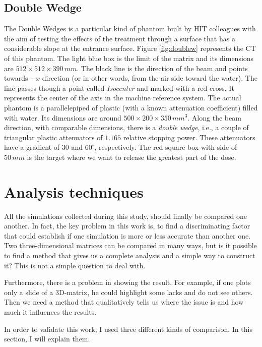 \documentclass[12pt, a4paper, twoside]{book}
\begin{document}
\subsection{Double Wedge} 
The Double Wedges is a particular kind of phantom built by HIT colleagues with the aim of testing the effects of the treatment through a surface that has a considerable slope at the entrance surface. 
Figure \ref{fig:doublew} represents the CT of this phantom. The light blue box is the limit of the matrix and its dimensions are $512\times512\times390\,mm$. The black line is the direction of the beam and points towards $-x$ direction (or in other words, from the air side toward the water). The line passes though a point called \emph{Isocenter} and marked with a red cross. It represents the center of the axis in the machine reference system.
The actual phantom is a parallelepiped of plastic (with a known attenuation coefficient) filled with water. Its dimensions are around $500\times200\times350\,mm^3$. Along the beam direction, with comparable dimensions, there is a \emph{double wedge}, i.e., a couple of triangular plastic attenuators of $1.165$ relative stopping power. These attenuators have a gradient of $30$ and $60^\circ$, respectively.
The red square box with side of $50\,mm$ is the target where we want to release the greatest part of the dose. 

\section{Analysis techniques}
All the simulations collected during this study, should finally be compared one another. 
In fact, the key problem in this work is, to find a discriminating factor that could establish if one simulation is more or less accurate than another one. Two three-dimensional matrices can be compared in many ways, but is it possible to find a method that gives us a complete analysis and a simple way to construct it?
This is not a simple question to deal with. 

Furthermore, there is a problem in showing the result. For example, if one plots only a slide of a 3D-matrix, he could highlight some lacks and do not see others. Then we need a method that qualitatively tells us where the issue is and how much it influences the results.

In order to validate this work, I used three different kinds of comparison. In this section, I will explain them.
\end{document}
